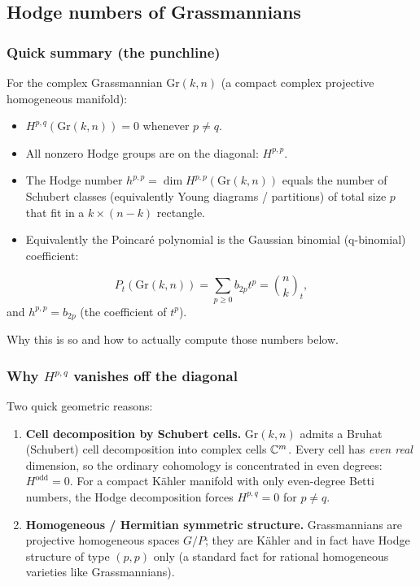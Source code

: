\documentclass{amsart}
\let\originalmathbb\mathbb
\renewcommand{\mathbb}[1]{%
    \ifstrequal{#1}{1}{\mathbbm{#1}}{\originalmathbb{#1}}%
}
\theoremstyle{plain}
\theoremstyle{definition}
\theoremstyle{remark}
\begin{document}
\subsection{Hodge numbers of Grassmannians}

\subsubsection{Quick summary (the punchline)}

For the complex Grassmannian $\mathrm{Gr}(k,n)$ (a compact complex projective homogeneous manifold):

\begin{itemize}
	\item $H^{p,q}(\mathrm{Gr}(k,n)) = 0$ whenever $p\neq q$.
	\item All nonzero Hodge groups are on the diagonal: $H^{p,p}$.
	\item The Hodge number $h^{p,p} = \dim H^{p,p}(\mathrm{Gr}(k,n))$ equals the number of Schubert classes (equivalently Young diagrams / partitions) of total size $p$ that fit in a $k\times(n-k)$ rectangle.
	\item Equivalently the Poincaré polynomial is the Gaussian binomial (q-binomial) coefficient:
\end{itemize}
\[
P_t(\mathrm{Gr}(k,n))=\sum_{p\ge0} b_{2p} t^{p}=\binom{n}{k}_t,
\]
and $h^{p,p}=b_{2p}$ (the coefficient of $t^p$).

Why this is so and how to actually compute those numbers below.

\subsubsection{Why \texorpdfstring{$H^{p,q}$}{H^p,q} vanishes off the diagonal}

Two quick geometric reasons:

\begin{enumerate}
	\item \textbf{Cell decomposition by Schubert cells.}
$\mathrm{Gr}(k,n)$ admits a Bruhat (Schubert) cell decomposition into complex cells $\mathbb{C}^m$. Every cell has \textit{even real} dimension, so the ordinary cohomology is concentrated in even degrees: $H^{\text{odd}}=0$. For a compact Kähler manifold with only even-degree Betti numbers, the Hodge decomposition forces $H^{p,q}=0$ for $p\ne q$.
	\item \textbf{Homogeneous / Hermitian symmetric structure.}
Grassmannians are projective homogeneous spaces $G/P$; they are Kähler and in fact have Hodge structure of type $(p,p)$ only (a standard fact for rational homogeneous varieties like Grassmannians).
\end{enumerate}
\end{document}
